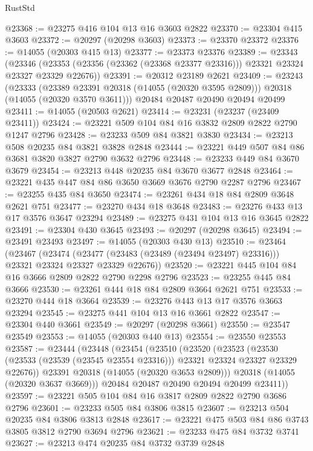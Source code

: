 \begin{lexlean}{RustStd}
\begin{coremodule}
@23368 := @23275 @416 @104 @13 @16 @3603 @2822
@23370 := @23304 @415 @3603
@23372 := @20297 (@20298 @3603)
@23373 := @23370 @23372
@23376 := @14055 (@20303 @415 @13)
@23377 := @23373 @23376
@23389 := @23343
    (@23346 (@23353 (@23356 (@23362 (@23368 @23377 @23316))) @23321 @23324 @23327 @23329 @22676))
@23391 := @20312 @23189 @2621
@23409 := @23243
    (@23333
      (@23389 @23391 @20318 (@14055 (@20320 @3595 @2809)))
      @20318
      (@14055 (@20320 @3570 @3611)))
    @20484
    @20487
    @20490
    @20494
    @20499
@23411 := @14055 (@20503 @2621)
@23414 := @23231 (@23237 (@23409 @23411))
@23424 := @23221 @509 @104 @84 @16 @3832 @2809 @2822 @2790 @1247 @2796
@23428 := @23233 @509 @84 @3821 @3830
@23434 := @23213 @508 @20235 @84 @3821 @3828 @2848
@23444 := @23221 @449 @507 @84 @86 @3681 @3820 @3827 @2790 @3632 @2796
@23448 := @23233 @449 @84 @3670 @3679
@23454 := @23213 @448 @20235 @84 @3670 @3677 @2848
@23464 := @23221 @435 @447 @84 @86 @3650 @3669 @3676 @2790 @2287 @2796
@23467 := @23255 @435 @84 @3650
@23474 := @23261 @434 @18 @84 @2809 @3648 @2621 @751
@23477 := @23270 @434 @18 @3648
@23483 := @23276 @433 @13 @17 @3576 @3647 @23294
@23489 := @23275 @431 @104 @13 @16 @3645 @2822
@23491 := @23304 @430 @3645
@23493 := @20297 (@20298 @3645)
@23494 := @23491 @23493
@23497 := @14055 (@20303 @430 @13)
@23510 := @23464
    (@23467
      (@23474 (@23477 (@23483 (@23489 (@23494 @23497) @23316))) @23321 @23324 @23327 @23329 @22676))
@23520 := @23221 @445 @104 @84 @16 @3666 @2809 @2822 @2790 @2298 @2796
@23523 := @23255 @445 @84 @3666
@23530 := @23261 @444 @18 @84 @2809 @3664 @2621 @751
@23533 := @23270 @444 @18 @3664
@23539 := @23276 @443 @13 @17 @3576 @3663 @23294
@23545 := @23275 @441 @104 @13 @16 @3661 @2822
@23547 := @23304 @440 @3661
@23549 := @20297 (@20298 @3661)
@23550 := @23547 @23549
@23553 := @14055 (@20303 @440 @13)
@23554 := @23550 @23553
@23587 := @23444
    (@23448
      (@23454
        (@23510
          (@23520
            (@23523
              (@23530 (@23533 (@23539 (@23545 @23554 @23316))) @23321 @23324 @23327 @23329 @22676))
            @23391
            @20318
            (@14055 (@20320 @3653 @2809)))
          @20318
          (@14055 (@20320 @3637 @3669)))
        @20484
        @20487
        @20490
        @20494
        @20499
        @23411))
@23597 := @23221 @505 @104 @84 @16 @3817 @2809 @2822 @2790 @3686 @2796
@23601 := @23233 @505 @84 @3806 @3815
@23607 := @23213 @504 @20235 @84 @3806 @3813 @2848
@23617 := @23221 @475 @503 @84 @86 @3743 @3805 @3812 @2790 @3694 @2796
@23621 := @23233 @475 @84 @3732 @3741
@23627 := @23213 @474 @20235 @84 @3732 @3739 @2848

\end{coremodule}
\end{lexlean}
